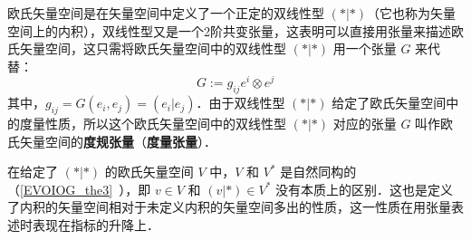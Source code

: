
欧氏矢量空间是在矢量空间中定义了一个正定的双线性型 $(*|*)$（它也称为矢量空间上的内积），双线性型又是一个2阶共变张量，这表明可以直接用张量来描述欧氏矢量空间，这只需将欧氏矢量空间中的双线性型 $(*|*)$ 用一个张量 $G$ 来代替：
\begin{equation}
G:=g_{ij} e^i\otimes e^j
\end{equation}
其中，$g_{ij}=G(e_i,e_j)=(e_i|e_j)$．由于双线性型 $(*|*)$ 给定了欧氏矢量空间中的度量性质，所以这个欧氏矢量空间中的双线性型 $(*|*)$ 对应的张量 $G$ 叫作欧氏矢量空间的\textbf{度规张量}（\textbf{度量张量}）．

在给定了 $(*|*)$ 的欧氏矢量空间 $V$ 中，$V$ 和 $V^*$ 是自然同构的（\autoref{EVOIOG_the3}~），即 $v\in V $ 和 $(v|*)\in V^*$ 没有本质上的区别．这也是定义了内积的矢量空间相对于未定义内积的矢量空间多出的性质，这一性质在用张量表述时表现在指标的升降上．
